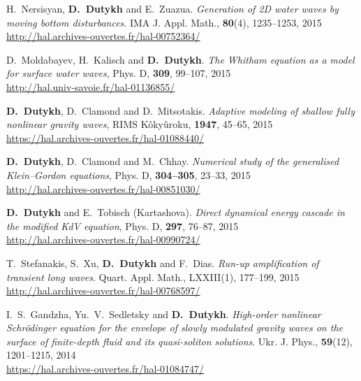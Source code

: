 \begin{etaremune}
  \item H.~Nersisyan, \textbf{D.~Dutykh} and E.~Zuazua. \textit{Generation of 2D water waves by moving bottom disturbances}. IMA J. Appl. Math., \textbf{80}(4), 1235--1253, 2015 \\ %
  \url{http://hal.archives-ouvertes.fr/hal-00752364/}
  
  \item D.~Moldabayev, H.~Kalisch and \textbf{D.~Dutykh}. \textit{The Whitham equation as a model for surface water waves}, Phys. D, \textbf{309}, 99--107, 2015 \\ %
  \url{http://hal.univ-savoie.fr/hal-01136855/}
  
  \item \textbf{D.~Dutykh}, D.~Clamond and D.~Mitsotakis. \textit{Adaptive modeling of shallow fully nonlinear gravity waves}, RIMS K\^oky\^uroku, \textbf{1947}, 45--65, 2015 \\ %
  \url{https://hal.archives-ouvertes.fr/hal-01088440/}
  
  \item \textbf{D.~Dutykh}, D.~Clamond and M.~Chhay. \textit{Numerical study of the generalised Klein--Gordon equations}, Phys. D, \textbf{304--305}, 23--33, 2015 \\ %
  \url{http://hal.archives-ouvertes.fr/hal-00851030/}
  
  \item \textbf{D.~Dutykh} and E.~Tobisch (Kartashova). \textit{Direct dynamical energy cascade in the modified KdV equation}, Phys. D, \textbf{297}, 76--87, 2015 \\ %
  \url{http://hal.archives-ouvertes.fr/hal-00990724/}

  \item T.~Stefanakis, S.~Xu, \textbf{D.~Dutykh} and F.~Dias. \textit{Run-up amplification of transient long waves}. Quart. Appl. Math., LXXIII(1), 177--199, 2015 \\ %
  \url{http://hal.archives-ouvertes.fr/hal-00768597/}


  \item I.~S.~Gandzha, Yu.~V.~Sedletsky and \textbf{D.~Dutykh}. \textit{High-order nonlinear Schr\"odinger equation for the envelope of slowly modulated gravity waves on the surface of finite-depth fluid and its quasi-soliton solutions}. Ukr. J. Phys., \textbf{59}(12), 1201--1215, 2014 \\ %
  \url{https://hal.archives-ouvertes.fr/hal-01084747/}
  

\end{etaremune}
